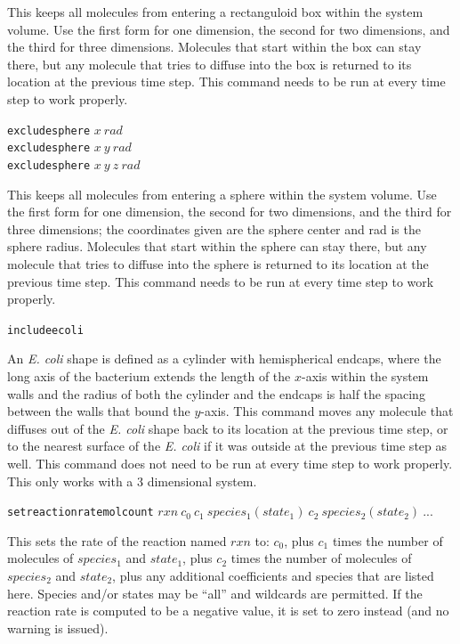 \documentclass {scrbook}
\newcommand {\ttt} {\texttt}
\begin{document}
\begin{description}
This keeps all molecules from entering a rectanguloid box within the system volume. Use the first form for one dimension, the second for two dimensions, and the third for three dimensions. Molecules that start within the box can stay there, but any molecule that tries to diffuse into the box is returned to its location at the previous time step. This command needs to be run at every time step to work properly.

\item{\ttt{excludesphere} $x\ rad$\\
\ttt{excludesphere} $x\ y\ rad$\\
\ttt{excludesphere} $x\ y\ z\ rad$}

This keeps all molecules from entering a sphere within the system volume. Use the first form for one dimension, the second for two dimensions, and the third for three dimensions; the coordinates given are the sphere center and rad is the sphere radius. Molecules that start within the sphere can stay there, but any molecule that tries to diffuse into the sphere is returned to its location at the previous time step. This command needs to be run at every time step to work properly.

\item{\ttt{includeecoli}}

An \textit{E. coli} shape is defined as a cylinder with hemispherical endcaps, where the long axis of the bacterium extends the length of the $x$-axis within the system walls and the radius of both the cylinder and the endcaps is half the spacing between the walls that bound the $y$-axis. This command moves any molecule that diffuses out of the \textit{E. coli} shape back to its location at the previous time step, or to the nearest surface of the \textit{E. coli} if it was outside at the previous time step as well. This command does not need to be run at every time step to work properly. This only works with a 3 dimensional system.

\item{\ttt{setreactionratemolcount} $rxn\ c_0\ c_1\ species_1(state_1)\ c_2\ species_2(state_2)\ ...$}

This sets the rate of the reaction named $rxn$ to: $c_0$, plus $c_1$ times the number of molecules of $species_1$ and $state_1$, plus $c_2$ times the number of molecules of $species_2$ and $state_2$, plus any additional coefficients and species that are listed here. Species and/or states may be ``all'' and wildcards are permitted. If the reaction rate is computed to be a negative value, it is set to zero instead (and no warning is issued).


\end{description}
\end{document}
